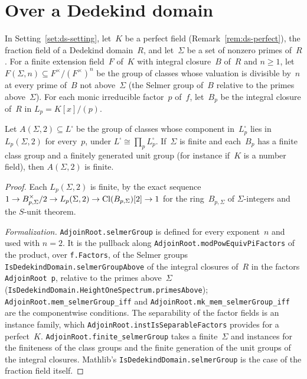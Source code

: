 \section{Over a Dedekind domain}
\label{sec:ds-dedekind}

\begin{setting}
\label{set:ds-dedekind}
In Setting~\ref{set:ds-setting}, let~$K$ be a perfect field (Remark~\ref{rem:ds-perfect}), the
fraction field of a Dedekind domain~$R$, and let~$\Sigma$ be a set of nonzero primes of~$R$. For
a finite extension field~$F$ of~$K$ with integral closure~$B$ of~$R$ and $n \ge 1$, let
$F(\Sigma, n) \subseteq F^\times/(F^\times)^n$ be the group of classes whose valuation is
divisible by~$n$ at every prime of~$B$ not above~$\Sigma$ (the Selmer group of~$B$ relative to the
primes above~$\Sigma$). For each monic irreducible factor~$p$ of~$f$, let~$B_p$ be the integral
closure of~$R$ in $L_p = K[x]/(p)$.
\end{setting}

\begin{definition}
\label{def:ds-selmer}
\leanok
Let $A(\Sigma, 2) \subseteq L^\square$ be the group of classes whose component in~$L_p^\square$
lies in~$L_p(\Sigma, 2)$ for every~$p$, under $L^\square \cong \prod_p L_p^\square$. If~$\Sigma$
is finite and each~$B_p$ has a finite class group and a finitely generated unit group (for
instance if~$K$ is a number field), then $A(\Sigma, 2)$ is finite.
\end{definition}

\begin{proof}
\leanok
Each $L_p(\Sigma, 2)$ is finite, by the exact sequence
$1 \to B_{p,\Sigma}^\times/2 \to L_p(\Sigma, 2) \to \operatorname{Cl}(B_{p,\Sigma})[2] \to 1$ for the
ring~$B_{p,\Sigma}$ of $\Sigma$-integers and the $S$-unit theorem.

\emph{Formalization.} \texttt{AdjoinRoot.selmerGroup} is defined for every exponent~$n$ and used
with $n = 2$. It is the pullback along \texttt{AdjoinRoot.modPowEquivPiFactors} of the product,
over \texttt{f.Factors}, of the Selmer groups \texttt{IsDedekindDomain.selmerGroupAbove} of the
integral closures of~$R$ in the factors \texttt{AdjoinRoot p}, relative to the primes above~$\Sigma$
(\texttt{IsDedekindDomain.HeightOneSpectrum.primesAbove}); \texttt{AdjoinRoot.mem\_selmerGroup\_iff}
and \texttt{AdjoinRoot.mk\_mem\_selmerGroup\_iff} are the componentwise conditions. The
separability of the factor fields is an instance family, which
\texttt{AdjoinRoot.instIsSeparableFactors} provides for a perfect~$K$.
\texttt{AdjoinRoot.finite\_selmerGroup} takes a finite~$\Sigma$ and instances for the finiteness of
the class groups and the finite generation of the unit groups of the integral closures. Mathlib's
\texttt{IsDedekindDomain.selmerGroup} is the case of the fraction field itself.
\end{proof}

